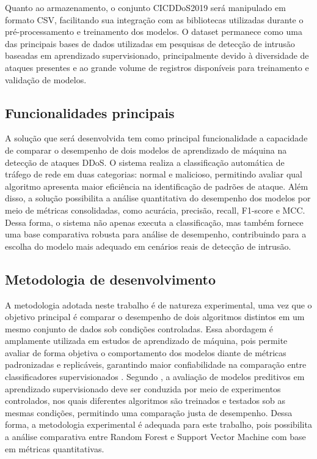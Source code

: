 \documentclass[
    12pt,                %
    openright,           %
    oneside,             %
    a4paper,             %
    english,             %
    brazil               %
]{abntex2}
\begin{document}
Quanto ao armazenamento, o conjunto CICDDoS2019 será manipulado em formato CSV, facilitando sua integração com as bibliotecas utilizadas durante o pré-processamento e treinamento dos modelos. O dataset permanece como uma das principais bases de dados utilizadas em pesquisas de detecção de intrusão baseadas em aprendizado supervisionado, principalmente devido à diversidade de ataques presentes e ao grande volume de registros disponíveis para treinamento e validação de modelos.

\subsection{Funcionalidades principais} A solução que será desenvolvida tem como principal funcionalidade a capacidade de comparar o desempenho de dois modelos de aprendizado de máquina na detecção de ataques DDoS. O sistema realiza a classificação automática de tráfego de rede em duas categorias: normal e malicioso, permitindo avaliar qual algoritmo apresenta maior eficiência na identificação de padrões de ataque.
Além disso, a solução possibilita a análise quantitativa do desempenho dos modelos por meio de métricas consolidadas, como acurácia, precisão, recall, F1-score e MCC. Dessa forma, o sistema não apenas executa a classificação, mas também fornece uma base comparativa robusta para análise de desempenho, contribuindo para a escolha do modelo mais adequado em cenários reais de detecção de intrusão.

\subsection{Metodologia de desenvolvimento} A metodologia adotada neste trabalho é de natureza experimental, uma vez que o objetivo principal é comparar o desempenho de dois algoritmos distintos em um mesmo conjunto de dados sob condições controladas. Essa abordagem é amplamente utilizada em estudos de aprendizado de máquina, pois permite avaliar de forma objetiva o comportamento dos modelos diante de métricas padronizadas e replicáveis, garantindo maior confiabilidade na comparação entre classificadores supervisionados \cite{James2021}.
Segundo , a avaliação de modelos preditivos em aprendizado supervisionado deve ser conduzida por meio de experimentos controlados, nos quais diferentes algoritmos são treinados e testados sob as mesmas condições, permitindo uma comparação justa de desempenho. Dessa forma, a metodologia experimental é adequada para este trabalho, pois possibilita a análise comparativa entre Random Forest e Support Vector Machine com base em métricas quantitativas.
\end{document}
